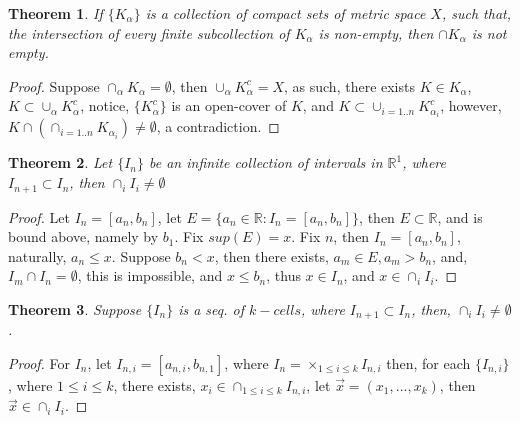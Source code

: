 \documentclass{amsart}
\numberwithin{equation}{section}
\theoremstyle{plain}
\newtheorem{thm}{Theorem}[section]
\theoremstyle{definition}
\begin{document}
\begin{thm}
  If $\{K_{\alpha}\}$ is a collection of compact sets of metric space $X$, such that, 
  the intersection of every finite subcollection of $K_{\alpha}$ is non-empty, then $\cap K_{\alpha}$ is
  not empty.
\end{thm}
\begin{proof}
  Suppose $\cap_{\alpha} K_{\alpha} = \emptyset$, then $\cup_{\alpha} K_{\alpha}^c = X$, as such, there exists 
  $K \in {K_{\alpha}}$, $K \subset \cup_{\alpha} K_{\alpha}^c$, notice, $\{K_{\alpha}^c \}$ is an open-cover
  of $K$, and $K \subset \cup_{i = 1..n} K_{\alpha_i}^c$, however, $K \cap (\cap_{i = 1..n} K_{\alpha_i}) \not= \emptyset$, 
  a contradiction.
\end{proof}


\begin{thm}
  Let $\{I_n\}$ be an infinite collection of intervals in $\mathbb{R}^1$, where $I_{n+1} \subset I_{n}$, then $\cap_i I_i \not= \emptyset$
\end{thm}
\begin{proof}
  Let $I_n = [a_n, b_n]$, let $E = \{a_n \in \mathbb{R}: I_n = [a_n, b_n]\}$, then $E \subset \mathbb{R}$, and is bound above, namely by
  $b_1$. Fix $sup(E) = x$. Fix $n$, then $I_n = [a_n, b_n]$, naturally, $a_n \leq x$. Suppose $b_n < x$, then there exists, $a_m \in E, a_m > b_n$, and, $I_m \cap I_n = \emptyset$, 
  this is impossible, and $x \leq b_n$, thus $x \in I_n$, and $x \in \cap_i I_i$. 
\end{proof}

\begin{thm}
  Suppose $\{I_n\}$ is a seq. of $k-cells$, where $I_{n+1} \subset I_n$, then, $\cap_i I_i \not= \emptyset$.
\end{thm}
\begin{proof}
  For $I_n$, let $I_{n,i} = [a_{n,i}, b_{n,1}]$, where $I_n = \times_{1 \leq i \leq k} I_{n,i}$
  then, for each $\{I_{n,i}\}$, where $1 \leq i \leq k$, there exists, $x_i \in \cap_{1 \leq i \leq k} I_{n, i}$, let
  $\vec{x} = (x_1,..., x_k)$, then $\vec{x} \in \cap_i I_i$.
\end{proof}
\end{document}
